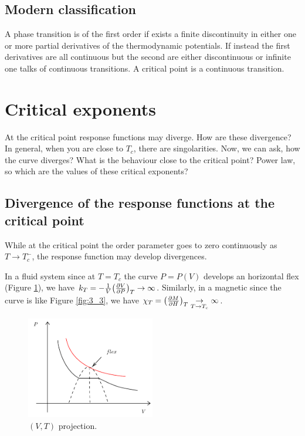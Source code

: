 \documentclass[../main/main.tex]{subfiles}
\begin{document}
\subsection{Modern classification}
A phase transition is of the first order if exists a finite discontinuity in either one or more partial derivatives of the thermodynamic potentials. If instead the first derivatives are all continuous but the second are either discontinuous or infinite one talks of continuous transitions.
A critical point is a continuous transition.




\section{Critical exponents}

At the critical point response functions may diverge. How are these divergence?
In general, when you are close to \( T_c \), there are singolarities. Now, we can ask, how the curve diverges? What is the behaviour close to the critical point? Power law, so which are the values of these critical exponents?

\subsection{Divergence of the response functions at the critical point}
While at the critical point the order parameter goes to zero continuously as \( T \rightarrow T_c^- \), the response function may develop divergences.
\begin{example}{}{}
In a fluid system since at \( T=T_c \) the curve \( P = P(V) \) develops an horizontal flex (Figure \ref{fig:3_2_2}), we have \( k_T = -\frac{1}{V} \qty(\pdv{V}{P} )_T  \rightarrow \infty  \). Similarly, in a magnetic since the curve is like Figure \ref{fig:3_3}, we have \( \chi _T = \qty(\pdv{M}{H} )_T \underset{T \rightarrow  T_c}{\rightarrow } \infty   \).

\end{example}

\begin{figure}[h!]
\centering
\includegraphics[width=0.5\textwidth]{../lessons/3_image/4.pdf}
\caption{\label{fig:3_2_2} \( (V,T) \) projection.  }
\end{figure}
\end{document}
